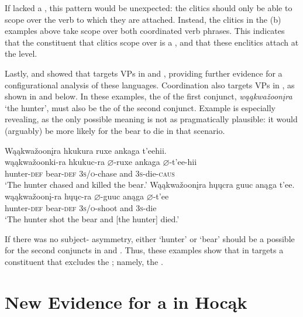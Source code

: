 \documentclass[output=paper]{LSP/langsci}
\begin{document}
If  lacked a , this pattern would be unexpected: the clitics should only be able to scope over the verb to which they are attached. Instead, the clitics in the (b) examples above take scope over both coordinated verb phrases. This indicates that the constituent that clitics scope over is a , and that these enclitics attach at the  level. 
	
Lastly, \citet{Boyle2007} and \citet{West2003} showed that  targets VPs in  and , providing further evidence for a configurational analysis of these languages.  Coordination also targets VPs in , as shown in  and  below. In these examples, the  of the first conjunct, \textit{wąąkwa\v{z}oon\k{i}ra} `the hunter', must also be the  of the second conjunct.  Example  is especially revealing, as the only possible meaning is not as pragmatically plausible: it would (arguably) be more likely for the bear to die in that scenario.

\begin{exe}
\ex\label{ex:jrs:35} 
\glll Wąąkwa\v{z}oon\k{i}ra 		hk{u}k{u}ra 			ruxe 				ank{a}ga 	t'eehii. \\
wąąkwa\v{z}oonk{i}-ra 	hk{u}k{u}c-ra 		$\varnothing$-ruxe  		ank{a}ga 	$\varnothing$-t'ee-hii \\
hunter-\textsc{def} 					bear-\textsc{def} 	\textsc{3s/o}-chase and 		\textsc{3s}-die-\textsc{caus} \\
\trans`The hunter chased and killed the bear.'
  \ex\label{ex:jrs:36} 
\glll Wąąkwa\v{z}oon\k{i}ra 		h\k{u}\k{u}cra 		guuc 				anąga 	t'ee. \\
wąąkwa\v{z}oon\k{i}-ra 	h\k{u}\k{u}c-ra 		$\varnothing$-guuc 			anąga 	$\varnothing$-t'ee \\
hunter-\textsc{def} 		bear-\textsc{def} 	\textsc{3s/o}-shoot 		and 		\textsc{3s}-die \\
\trans `The hunter shot the bear and [the hunter] died.'
\end{exe}
	
If there was no subject- asymmetry, either `hunter' or `bear' should be a possible  for the second conjuncts in  and . Thus, these examples show that  in  targets a constituent that excludes the ; namely, the .

\section{New Evidence for a  in Hocąk}\label{sec:jrs:4}
\end{document}
